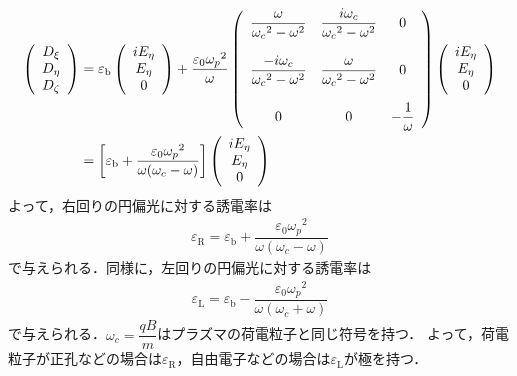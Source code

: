 \begin{align}\left(
  \begin{array}{c}
    D_{\xi} \\
    D_{\eta} \\
    D_{\zeta}
  \end{array}
  \right)
  &=
  \varepsilon_{\text{b}}
  \left(
  \begin{array}{c}
    iE_{\eta} \\
    E_{\eta} \\
    0
  \end{array}
  \right)
  +
  \dfrac{\varepsilon_0{\omega_p}^2}{\omega}\left(
  \begin{array}{ccc}
    \dfrac{\omega}{{\omega_c}^2-\omega^2} & \dfrac{i\omega_c}{{\omega_c}^2-\omega^2} & 0 \\ \\
    \dfrac{-i\omega_c}{{\omega_c}^2-\omega^2} & \dfrac{\omega}{{\omega_c}^2-\omega^2} & 0 \\ \\
    0 & 0 & -\dfrac{1}{\omega}
  \end{array}
  \right)
  \left(
  \begin{array}{c}
    iE_{\eta} \\
    E_{\eta} \\
    0
  \end{array}
  \right)\notag\\
  &=
  \left[\varepsilon_{\text{b}}+\dfrac{\varepsilon_0{\omega_p}^2}{\omega(\omega_c-\omega)}\right]
  \left(
  \begin{array}{c}
    iE_{\eta} \\
    E_{\eta} \\
    0
  \end{array}
  \right)
\end{align}
よって，右回りの円偏光に対する誘電率は
\begin{align}
  \varepsilon_{\text{R}}=\varepsilon_{\text{b}}+\dfrac{\varepsilon_0{\omega_p}^2}{\omega(\omega_c-\omega)}\label{helicon_perR}
\end{align}
で与えられる．同様に，左回りの円偏光に対する誘電率は
\begin{align}
  \varepsilon_{\text{L}}=\varepsilon_{\text{b}}-\dfrac{\varepsilon_0{\omega_p}^2}{\omega(\omega_c+\omega)}\label{helicon_perL}
\end{align}
で与えられる．$\omega_c=\dfrac{qB}{m}$はプラズマの荷電粒子と同じ符号を持つ．
よって，荷電粒子が正孔などの場合は$\varepsilon_{\text{R}}$，自由電子などの場合は$\varepsilon_{\text{L}}$が極を持つ．
